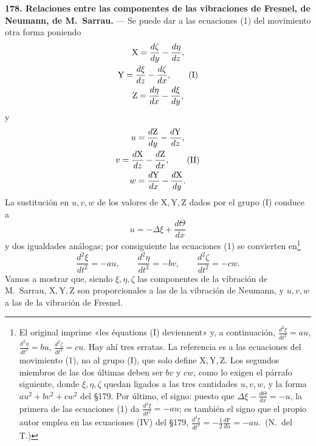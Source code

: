 \noindent\textbf{178. Relaciones entre las componentes de las vibraciones
de Fresnel, de Neumann, de M.~Sarrau.} — Se puede dar a las ecuaciones (1)
del movimiento otra forma poniendo
\begin{gather}
\mathrm X=\frac{d\zeta}{dy}-\frac{d\eta}{dz},\notag\\
\mathrm Y=\frac{d\xi}{dz}-\frac{d\zeta}{dx},
\tag{I}\\
\mathrm Z=\frac{d\eta}{dx}-\frac{d\xi}{dy},\notag
\end{gather}
y
\begin{gather}
u=\frac{d\mathrm Z}{dy}-\frac{d\mathrm Y}{dz},\notag\\
v=\frac{d\mathrm X}{dz}-\frac{d\mathrm Z}{dx},
\tag{II}\\
w=\frac{d\mathrm Y}{dx}-\frac{d\mathrm X}{dy}.\notag
\end{gather}
La sustitución en $u,v,w$ de los valores de $\mathrm X,\mathrm Y,\mathrm Z$
dados por el grupo (I) conduce a
\[
u=-\Delta\xi+\frac{d\Theta}{dx}
\]
y dos igualdades análogas; por consiguiente las ecuaciones (1) se
convierten en\footnote{El original imprime «les équations (I)
deviennent» y, a continuación, $\frac{d^2\xi}{dt^2}=au$,
$\frac{d^2\eta}{dt^2}=bu$, $\frac{d^2\zeta}{dt^2}=cu$. Hay ahí tres
erratas. La referencia es a las ecuaciones del movimiento (1), no al
grupo (I), que solo define $\mathrm X,\mathrm Y,\mathrm Z$. Los segundos
miembros de las dos últimas deben ser $bv$ y $cw$, como lo exigen el
párrafo siguiente, donde $\xi,\eta,\zeta$ quedan ligados a las tres
cantidades $u,v,w$, y la forma $au^2+bv^2+cw^2$ del §179. Por último, el signo: puesto que
$\Delta\xi-\frac{d\Theta}{dx}=-u$, la primera de las ecuaciones (1) da
$\frac{d^2\xi}{dt^2}=-au$; es también el signo que el propio autor emplea
en las ecuaciones (IV) del §179,
$\frac{d^2\xi}{dt^2}=-\frac12\frac{d\mathrm F}{du}=-au$.~(N.~del T.)}
\begin{equation}
\frac{d^2\xi}{dt^2}=-au,\qquad \frac{d^2\eta}{dt^2}=-bv,\qquad
\frac{d^2\zeta}{dt^2}=-cw.
\tag{III}
\end{equation}
Vamos a mostrar que, siendo $\xi,\eta,\zeta$ las componentes de la
vibración de M.~Sarrau, $\mathrm X,\mathrm Y,\mathrm Z$ son proporcionales
a las de la vibración de Neumann, y $u,v,w$ a las de la vibración de
Fresnel.

